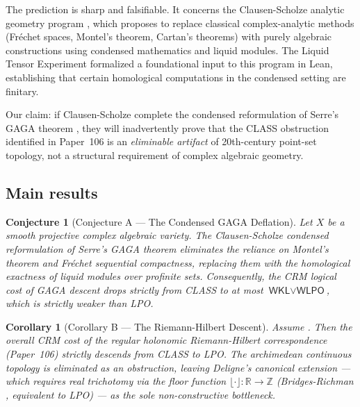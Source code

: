 \documentclass[11pt,a4paper]{article}
\theoremstyle{plain}
\newtheorem{corollary}[theorem]{Corollary}
\newtheorem{conjecture}[theorem]{Conjecture}
\theoremstyle{definition}
\newcommand{\WKL}{\textsf{WKL}}
\newcommand{\WLPO}{\textsf{WLPO}}
\newcommand{\LPO}{\textsf{LPO}}
\newcommand{\CLASS}{\textsf{CLASS}}
\newcommand{\CRM}{\textsf{CRM}}
\newcommand{\Z}{\mathbb{Z}}
\newcommand{\R}{\mathbb{R}}
\begin{document}
The prediction is sharp and falsifiable.
It concerns the Clausen-Scholze analytic geometry program \cite{ClausenScholze2022}, which proposes to replace classical complex-analytic methods (Fréchet spaces, Montel's theorem, Cartan's theorems) with purely algebraic constructions using condensed mathematics and liquid modules.
The Liquid Tensor Experiment \cite{Commelin2022} formalized a foundational input to this program in Lean, establishing that certain homological computations in the condensed setting are finitary.

Our claim: if Clausen-Scholze complete the condensed reformulation of Serre's GAGA theorem \cite{Serre1956}, they will inadvertently prove that the \CLASS{} obstruction identified in Paper~106 is an \emph{eliminable artifact} of 20th-century point-set topology, not a structural requirement of complex algebraic geometry.

\subsection{Main results}

\begin{conjecture}[Conjecture A --- The Condensed GAGA Deflation]\label{conj:condensed-gaga}
Let $X$ be a smooth projective complex algebraic variety.
The Clausen-Scholze condensed reformulation of Serre's GAGA theorem eliminates the reliance on Montel's theorem and Fréchet sequential compactness, replacing them with the homological exactness of liquid modules over profinite sets.
Consequently, the \CRM{} logical cost of GAGA descent drops strictly from \CLASS{} to at most $\WKL \vee \WLPO$, which is strictly weaker than \LPO.
\end{conjecture}

\begin{corollary}[Corollary B --- The Riemann-Hilbert Descent]\label{cor:rh-descent}
Assume .
Then the overall \CRM{} cost of the regular holonomic Riemann-Hilbert correspondence (Paper~106) strictly descends from \CLASS{} to \LPO.
The archimedean continuous topology is eliminated as an obstruction, leaving Deligne's canonical extension --- which requires real trichotomy via the floor function $\lfloor \cdot \rfloor : \R \to \Z$ (Bridges-Richman \cite{BridgesRichman1987}, equivalent to \LPO) --- as the sole non-constructive bottleneck.
\end{corollary}
\end{document}
